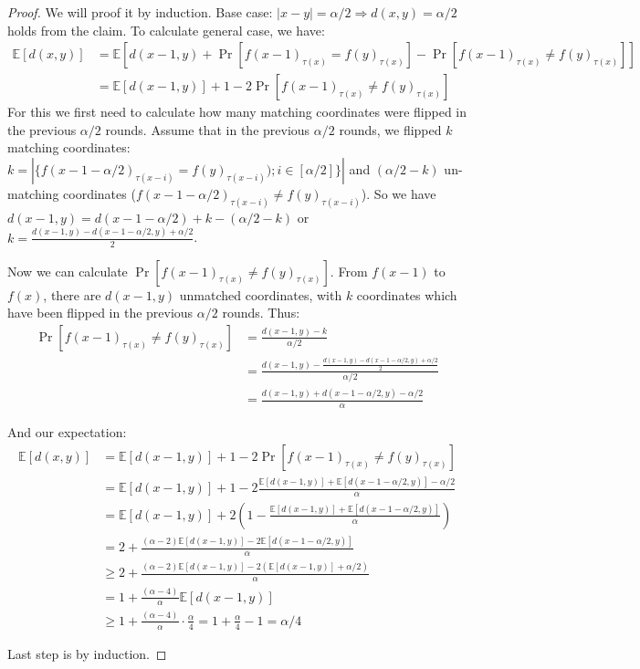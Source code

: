 \documentclass{scrartcl}
\newcommand{\E}{{\mathbb E}}
\begin{document}
\begin{proof}
	We will proof it by induction. Base case: $|x-y|=\alpha/2 \Rightarrow d(x,y)=\alpha/2$ holds from the claim. To calculate general case, we have:
	 \begin{align*}\E[d(x, y)] &= \E[d(x - 1, y) + \Pr[f(x-1)_{\tau(x)} = f(y)_{\tau(x)}] - \Pr[f(x-1)_{\tau(x)} \neq f(y)_{\tau(x)}]] \\
	 &= \E[d(x - 1, y)] + 1 - 2\Pr[f(x-1)_{\tau(x)} \neq f(y)_{\tau(x)}]
\end{align*}
For this we first need to calculate how many matching coordinates were flipped in the previous $\alpha/2$ rounds. Assume that in the previous $\alpha/2$ rounds, we flipped $k$ matching coordinates: $k=|\{f(x - 1 - \alpha/2)_{\tau(x-i)} = f(y)_{\tau(x-i)}); i \in [\alpha/2]\}|$ and $(\alpha/2 - k)$ un-matching coordinates ($f(x - 1 - \alpha/2)_{\tau(x-i)} \neq f(y)_{\tau(x-i)}$). So we have $d(x-1, y) = d(x-1-\alpha/2) + k - (\alpha/2 - k)$ or $k = \frac{d(x-1,y)-d(x-1-\alpha/2,y) + \alpha/2}{2}$.
	
Now we can calculate $\Pr[f(x-1)_{\tau(x)} \neq f(y)_{\tau(x)}]$. From $f(x-1)$ to $f(x)$, there are $d(x-1, y)$ unmatched coordinates, with $k$ coordinates which have been flipped in the previous $\alpha / 2$ rounds. Thus:
\begin{align*}
\Pr[f(x-1)_{\tau(x)} \neq f(y)_{\tau(x)}]
&= \frac{d(x-1,y) - k}{\alpha/2} \\
&= \frac{d(x-1,y) - \frac{d(x-1,y)-d(x-1-\alpha/2,y) + \alpha/2}{2}}{\alpha/2} \\
&= \frac{d(x-1,y)+d(x-1-\alpha/2,y) - \alpha/2}{\alpha}
\end{align*}

And our expectation:
\begin{align*}
\E[d(x,y)]
&= \E[d(x-1,y)] + 1 - 2\Pr[f(x-1)_{\tau(x)} \neq f(y)_{\tau(x)}] \\
&= \E[d(x-1,y)] + 1-2\frac{\E[d(x-1,y)]+\E[d(x-1-\alpha/2,y)] - \alpha/2}{\alpha} \\
&= \E[d(x-1,y)] + 2\left(1-\frac{\E[d(x-1,y)]+\E[d(x-1-\alpha/2,y)]}{\alpha}\right) \\
&= 2+\frac{(\alpha-2)\E[d(x-1,y)] - 2\E[d(x-1-\alpha/2,y)]}{\alpha} \\
&\geq 2+\frac{(\alpha-2)\E[d(x-1,y)] - 2(\E[d(x-1,y)] + \alpha/2)}{\alpha} \\
&= 1 + \frac{(\alpha-4)}{\alpha}\E[d(x-1,y)] \\
&\geq 1+\frac{(\alpha-4)}{\alpha}\cdot\frac{\alpha}{4} = 1 + \frac{\alpha}{4} - 1 = \alpha/4
\end{align*}

Last step is by induction.
\end{proof}
\end{document}
